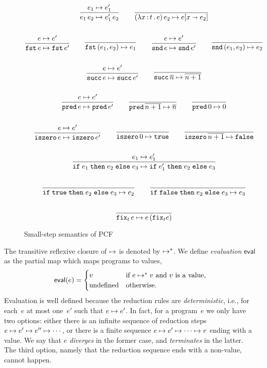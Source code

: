 \begin{figure}[htpb]
  \centering
\begin{gather*}
  \begin{gathered}\dfrac{e_1 \mapsto e_1'}{e_1 \, e_2 \mapsto e_1'\, e_2}\end{gathered}
  \qquad
  \dfrac{}{(\lambda x \,{:}\, t\,.\,e)\,e_2 \mapsto e[x \shortrightarrow e_2]}
  \\ \\
  \begin{gathered}\dfrac{e \mapsto e'}{\mathtt{fst}\,e \mapsto \mathtt{fst}\,e'}\end{gathered}
  \qquad
  \dfrac{}{\mathtt{fst}\,(e_1, e_2) \mapsto e_1}
  \qquad
  \begin{gathered}\dfrac{e \mapsto e'}{\mathtt{snd}\,e \mapsto \mathtt{snd}\,e'}\end{gathered}
  \qquad
  \dfrac{}{\mathtt{snd}\,(e_1, e_2) \mapsto e_2}
  \\ \\
  \begin{gathered}\dfrac{e \mapsto e'}{\mathtt{succ}\,e \mapsto \mathtt{succ}\,e'}\end{gathered}
  \qquad
  \dfrac{}{\mathtt{succ}\,\overline{n} \mapsto \overline{n+1}}
  \\ \\
  \begin{gathered}\dfrac{e \mapsto e'}{\mathtt{pred}\,e \mapsto \mathtt{pred}\,e'}\end{gathered}
  \qquad
  \dfrac{}{\mathtt{pred}\,\overline{n+1} \mapsto \overline{n}}
  \qquad
  \dfrac{}{\mathtt{pred}\,0 \mapsto 0}
  \\ \\
  \begin{gathered}\dfrac{e \mapsto e'}{\mathtt{iszero}\,e \mapsto \mathtt{iszero}\,e'}\end{gathered}
  \qquad
  \dfrac{}{\mathtt{iszero}\,0 \mapsto \mathtt{true}}
  \qquad
  \dfrac{}{\mathtt{iszero}\,\overline{n+1} \mapsto \mathtt{false}}
  \\ \\
  \begin{gathered}\dfrac{e_1 \mapsto e_1'}{\mathtt{if}\;e_1\;\mathtt{then}\;e_2\;\mathtt{else}\;e_3 \mapsto \mathtt{if}\;e_1'\;\mathtt{then}\;e_2\;\mathtt{else}\;e_3}\end{gathered}
  \\ \\
  \dfrac{}{\mathtt{if}\;\mathtt{true}\;\mathtt{then}\;e_2\;\mathtt{else}\;e_3 \mapsto e_2}
  \qquad
  \dfrac{}{\mathtt{if}\;\mathtt{false}\;\mathtt{then}\;e_2\;\mathtt{else}\;e_3 \mapsto e_3}
  \\ \\
  \dfrac{}{\mathtt{fix}_t\,e \mapsto e\,(\mathtt{fix}_t e)}
\end{gather*}
  \caption{Small-step semantics of PCF}
  \label{fig:pcf}
\end{figure}

The transitive reflexive closure of $\mapsto$ is denoted by $\mapsto^{*}$.
We define \emph{evaluation} $\mathsf{eval}$ as the partial map which
maps programs to values,
%
\begin{equation*}
  \mathsf{eval}(e) =
  \begin{cases}
    v & \text{if $e \mapsto^{*} v$ and $v$ is a value,}\\
    \text{undefined} & \text{otherwise.}
  \end{cases}
\end{equation*}
%
Evaluation is well defined because the reduction rules are
\emph{deterministic}, i.e., for each~$e$ at most one~$e'$ such that $e
\mapsto e'$. In fact, for a program~$e$ we only have two options:
either there is an infinite sequence of reduction steps $e \mapsto e'
\mapsto e'' \mapsto \cdots$, or there is a finite sequence $e \mapsto e'
\mapsto \cdots \mapsto v$ ending with a value. We say that $e$
\emph{diverges} in the former case, and \emph{terminates} in the
latter. The third option, namely that the reduction sequence ends with
a non-value, cannot happen.

